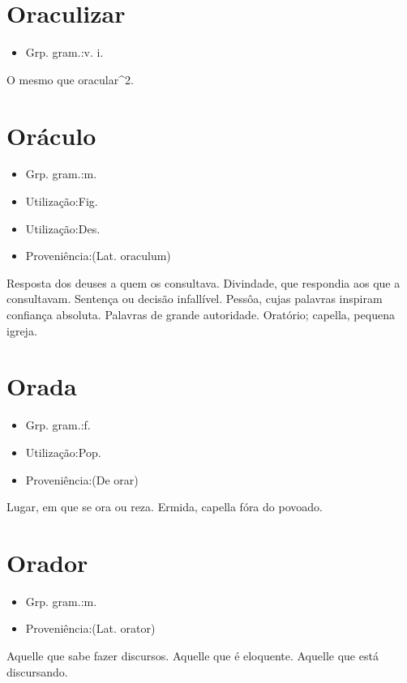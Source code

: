\section{Oraculizar}
\begin{itemize}
\item {Grp. gram.:v. i.}
\end{itemize}
O mesmo que \textunderscore oracular\textunderscore ^2.
\section{Oráculo}
\begin{itemize}
\item {Grp. gram.:m.}
\end{itemize}
\begin{itemize}
\item {Utilização:Fig.}
\end{itemize}
\begin{itemize}
\item {Utilização:Des.}
\end{itemize}
\begin{itemize}
\item {Proveniência:(Lat. \textunderscore oraculum\textunderscore )}
\end{itemize}
Resposta dos deuses a quem os consultava.
Divindade, que respondia aos que a consultavam.
Sentença ou decisão infallível.
Pessôa, cujas palavras inspiram confiança absoluta.
Palavras de grande autoridade.
Oratório; capella, pequena igreja.
\section{Orada}
\begin{itemize}
\item {Grp. gram.:f.}
\end{itemize}
\begin{itemize}
\item {Utilização:Pop.}
\end{itemize}
\begin{itemize}
\item {Proveniência:(De \textunderscore orar\textunderscore )}
\end{itemize}
Lugar, em que se ora ou reza.
Ermida, capella fóra do povoado.
\section{Orador}
\begin{itemize}
\item {Grp. gram.:m.}
\end{itemize}
\begin{itemize}
\item {Proveniência:(Lat. \textunderscore orator\textunderscore )}
\end{itemize}
Aquelle que sabe fazer discursos.
Aquelle que é eloquente.
Aquelle que está discursando.
